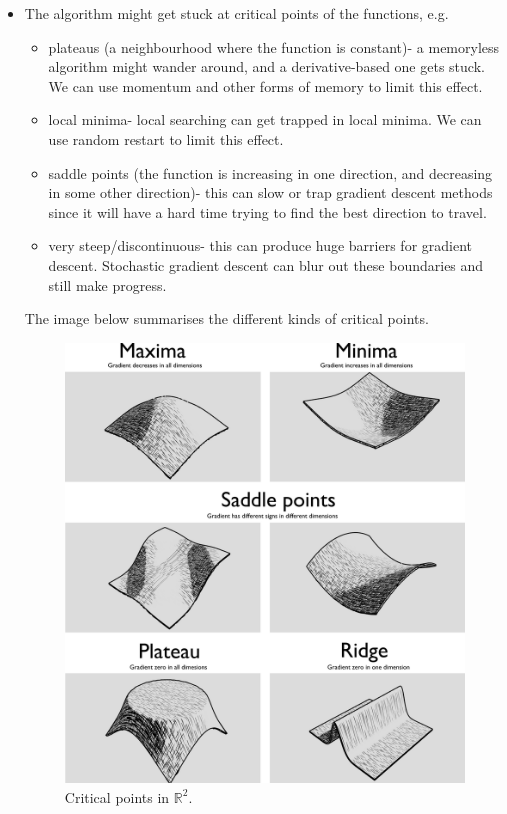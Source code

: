\documentclass[a4paper, openany]{memoir}
\begin{document}
\begin{itemize}
    \item The algorithm might get stuck at critical points of the functions, e.g.
    \begin{itemize}
        \item plateaus (a neighbourhood where the function is constant)- a memoryless algorithm might wander around, and a derivative-based one gets stuck. We can use momentum and other forms of memory to limit this effect.
        \item local minima- local searching can get trapped in local minima. We can use random restart to limit this effect.
        \item saddle points (the function is increasing in one direction, and decreasing in some other direction)- this can slow or trap gradient descent methods since it will have a hard time trying to find the best direction to travel.
        \item very steep/discontinuous- this can produce huge barriers for gradient descent. Stochastic gradient descent can blur out these boundaries and still make progress.
    \end{itemize}
    The image below summarises the different kinds of critical points.
    \begin{figure}[H]
        \centering
        \includegraphics[scale=0.15]{src/4.23 2D stationary points.png}
        \caption{Critical points in $\mathbb{R}^2$.}
    \end{figure}
\end{itemize}
\end{document}
